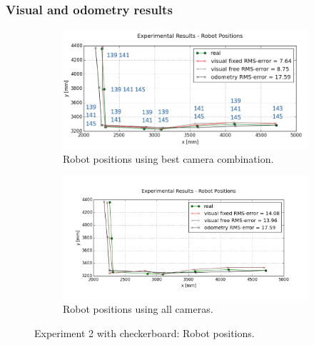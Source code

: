 \subsubsection{Visual and odometry results}

\begin{figure}
    \centering
    \begin{subfigure}{0.7\linewidth}
        \centering
        \includegraphics[width=\textwidth]{files/res3_best_err.png}
        \caption{Robot positions using best camera combination.}
        \label{fig:res3_best_err}
    \end{subfigure} 
    \begin{subfigure}{0.8\linewidth}
        \centering
        \includegraphics[width=\textwidth]{files/res3_all_err.png}
        \caption{Robot positions using all cameras.}
        \label{fig:res3_all}
    \end{subfigure} 
    \caption{Experiment 2 with checkerboard: Robot positions.}
    \label{fig:res3_err}
\end{figure}

